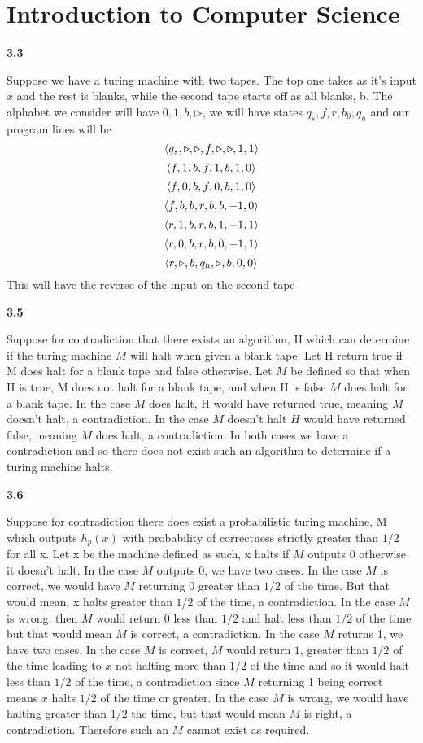 \section{Introduction to Computer Science}

\textbf{3.3}

Suppose we have a turing machine with two tapes. The top one takes as it's input $x$ and the rest is blanks, while the second tape starts off as all blanks, b. The alphabet we consider will have $ 0,1,b, \triangleright$, we will have states $ q_s, f, r,b_0,q_h $ and our program lines will be
\[\braket{q_s,\triangleright,\triangleright,f,\triangleright,\triangleright, 1,1}\]
\[\braket{f,1,b,f,1,b, 1, 0}\]
\[\braket{f,0,b,f,0,b,1,0}\]
\[\braket{f,b,b,r,b,b,-1,0}\]
\[\braket{r,1,b,r,b,1,-1,1}\]
\[\braket{r,0,b,r,b,0,-1,1}\]
\[\braket{r,\triangleright,b,q_h,\triangleright,b,0,0}\]
This will have the reverse of the input on the second tape

\textbf{3.5}

Suppose for contradiction that there exists an algorithm, H which can determine if the turing machine $M$ will halt when given a blank tape. Let H return true if M does halt for a blank tape and false otherwise. Let $M$ be defined so that when H is true, M does not halt for a blank tape, and when H is false $M$ does halt for a blank tape. In the case $M$ does halt, H would have returned true, meaning $M$ doesn't halt, a contradiction. In the case $M$ doesn't halt $H$ would have returned false, meaning $M$ does halt, a contradiction. In both cases we have a contradiction and so there does not exist such an algorithm to determine if a turing machine halts.

\textbf{3.6}

Suppose for contradiction there does exist a probabilistic turing machine, M which outputs $h_p(x)$ with probability of correctness strictly greater than $1/2$ for all x. Let x be the machine defined as such, x halts if $M$ outputs 0 otherwise it doesn't halt. In the case $M$ outputs 0, we have two cases. In the case $M$ is correct, we would have $ M$ returning $0$ greater than $1/2$ of the time. But that would mean, x halts greater than $1/2$ of the time, a contradiction. In the case $M$ is wrong, then $M$ would return 0 less than $1/2$ and halt less than $1/2$ of the time but that would mean $M$ is correct, a contradiction. In the case $M$ returns 1, we have two cases. In the case $M$ is correct, $M$ would return $1$, greater than $1/2$ of the time leading to $x$ not halting more than $1/2$ of the time and so it would halt less than $1/2$ of the time, a contradiction since $M$ returning 1 being correct means $x$ halts $1/2$ of the time or greater. In the case $M$ is wrong, we would have halting greater than $1/2$ the time, but that would mean $M$ is right, a contradiction. Therefore such an $M$ cannot exist as required.

